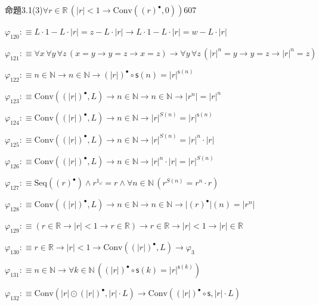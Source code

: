 \begin{fullproof}{命題3.1(3)}{$\forall r \in \mathbb{R}\,(\lvert r \rvert < 1 \to \mathrm{Conv}({(r)^{\bullet}},0))$}{607}
\begin{abbrevlist}
\item $\varphi_{120} :\equiv L \cdot 1 - L \cdot \lvert r \rvert = z - L \cdot \lvert r \rvert \to L \cdot 1 - L \cdot \lvert r \rvert = w - L \cdot \lvert r \rvert$
\item $\varphi_{121} :\equiv \forall x\,\forall y\,\forall z\,(x = y \to y = z \to x = z) \to \forall y\,\forall z\,({{\lvert r \rvert}^{n}} = y \to y = z \to {{\lvert r \rvert}^{n}} = z)$
\item $\varphi_{122} :\equiv n \in \mathbb{N} \to n \in \mathbb{N} \to {(\lvert r \rvert)^{\bullet}} \circ \mathsf{s}(n) = {{\lvert r \rvert}^{\mathsf{s}(n)}}$
\item $\varphi_{123} :\equiv \mathrm{Conv}({(\lvert r \rvert)^{\bullet}},L) \to n \in \mathbb{N} \to n \in \mathbb{N} \to \lvert {{r}^{n}} \rvert = {{\lvert r \rvert}^{n}}$
\item $\varphi_{124} :\equiv \mathrm{Conv}({(\lvert r \rvert)^{\bullet}},L) \to n \in \mathbb{N} \to {{\lvert r \rvert}^{S(n)}} = {{\lvert r \rvert}^{\mathsf{s}(n)}}$
\item $\varphi_{125} :\equiv \mathrm{Conv}({(\lvert r \rvert)^{\bullet}},L) \to n \in \mathbb{N} \to {{\lvert r \rvert}^{S(n)}} = {{\lvert r \rvert}^{n}} \cdot \lvert r \rvert$
\item $\varphi_{126} :\equiv \mathrm{Conv}({(\lvert r \rvert)^{\bullet}},L) \to n \in \mathbb{N} \to {{\lvert r \rvert}^{n}} \cdot \lvert r \rvert = {{\lvert r \rvert}^{S(n)}}$
\item $\varphi_{127} :\equiv \mathrm{Seq}({(r)^{\bullet}}) \land {{r}^{1_{\omega}}} = r \land \forall n \in \mathbb{N}\,({{r}^{S(n)}} = {{r}^{n}} \cdot r)$
\item $\varphi_{128} :\equiv \mathrm{Conv}({(\lvert r \rvert)^{\bullet}},L) \to n \in \mathbb{N} \to n \in \mathbb{N} \to \lvert {(r)^{\bullet}} \rvert(n) = \lvert {{r}^{n}} \rvert$
\item $\varphi_{129} :\equiv (r \in \mathbb{R} \to \lvert r \rvert < 1 \to r \in \mathbb{R}) \to r \in \mathbb{R} \to \lvert r \rvert < 1 \to \lvert r \rvert \in \mathbb{R}$
\item $\varphi_{130} :\equiv r \in \mathbb{R} \to \lvert r \rvert < 1 \to \mathrm{Conv}({(\lvert r \rvert)^{\bullet}},L) \to \varphi_{3}$
\item $\varphi_{131} :\equiv n \in \mathbb{N} \to \forall k \in \mathbb{N}\,({(\lvert r \rvert)^{\bullet}} \circ \mathsf{s}(k) = {{\lvert r \rvert}^{\mathsf{s}(k)}})$
\item $\varphi_{132} :\equiv \mathrm{Conv}(\lvert r \rvert \odot {(\lvert r \rvert)^{\bullet}},\lvert r \rvert \cdot L) \to \mathrm{Conv}({(\lvert r \rvert)^{\bullet}} \circ \mathsf{s},\lvert r \rvert \cdot L)$

\end{abbrevlist}
\end{fullproof}
